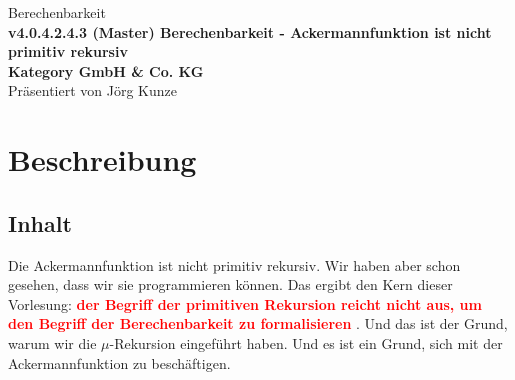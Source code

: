 \documentclass[a4paper]{amsart}
\theoremstyle{definition}
\newcommand{\imporant}[1]{ \textcolor{red}{\textbf{#1}} }
\begin{document}
\begin{titlepage}
\centering
{\huge
Berechenbarkeit\\[1cm]
\textbf{v4.0.4.2.4.3 (Master) Berechenbarkeit - Ackermannfunktion ist nicht primitiv rekursiv}
}\\[1cm]

\textbf{Kategory GmbH \& Co. KG}\\
Pr\"asentiert von Jörg Kunze

\end{titlepage}

%

\newpage

\section*{Beschreibung}

\subsection*{Inhalt}
Die Ackermannfunktion ist nicht primitiv rekursiv. Wir haben aber schon gesehen, dass wir sie programmieren
können. Das ergibt den Kern dieser Vorlesung: \imporant{der Begriff der primitiven Rekursion reicht 
nicht aus, um
den Begriff der Berechenbarkeit zu formalisieren}. Und das ist der Grund, warum wir die $\mu$-Rekursion
eingeführt haben. Und es ist ein Grund, sich mit der Ackermannfunktion zu beschäftigen.
\end{document}
